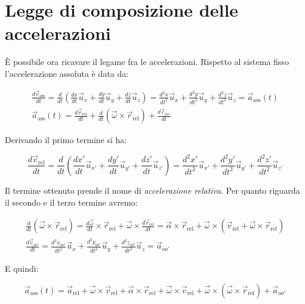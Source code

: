 \begin{figure}[htpb]
\end{figure}

\section{Legge di composizione delle accelerazioni}

È possibile ora ricavare il legame fra le accelerazioni. Rispetto al sistema fisso l'accelerazione assoluta è data da:

\begin{gather*}
	\frac{d\vec{v}_{\text{ass} }}{dt}=\frac{d}{dt}\left(\frac{dx}{dt} \vec{u}_x + \frac{dy}{dt} \vec{u}_y+ \frac{dz}{dt} \vec{u}_z\right)=\frac{d^2x}{dt^2} \vec{u}_x+ \frac{d^2y}{dt^2} \vec{u}_y+\frac{d^2z}{dt^2} \vec{u}_z=\vec{a}_{\text{ass}} (t) \\
	\vec{a}_{\text{ass}}(t)=\frac{d\vec{v}_{\text{rel}}}{dt}+\frac{d}{dt}(\vec{\omega} \times \vec{r}_{\text{rel}})+\frac{d\vec{v}_{oo'}}{dt}
\end{gather*}

Derivando il primo termine si ha:

\[
	\frac{d\vec{v}_{\text{rel}}}{dt}=\frac{d}{dt}\left(\frac{dx'}{dt}\vec{u}_{x'}+\frac{dy'}{dt}\vec{u}_{y'}+\frac{dz'}{dt}\vec{u}_{z'}\right)=\frac{d^2x'}{dt^2} \vec{u}_{x'} + \frac{d^2y'}{dt^2} \vec{u}_{y'}+ \frac{d^2z'}{dt^2} \vec{u}_{z'}
\]

Il termine ottenuto prende il nome di \emph{accelerazione relativa}. Per quanto riguarda il secondo e il terzo termine avremo:

\begin{gather*}
	\frac{d}{dt}(\vec{\omega} \times \vec{r}_{\text{rel}})=\frac{d\vec{\omega}}{dt} \times \vec{r}_{\text{rel}}+\vec{\omega} \times \frac{d\vec{r}_{\text{rel}} }{dt} = \vec{\alpha} \times \vec{r}_{\text{rel}}+\vec{\omega} \times( \vec{v}_{\text{rel}}+\vec{\omega} \times \vec{r}_{\text{rel}}) \\
	\frac{d\vec{v}_{oo'}}{dt}= \frac{d^2x_{oo'}}{dt^2} \vec{u}_x+ \frac{d^2y_{oo'}}{dt^2} \vec{u}_y+ \frac{d^2z_{oo'}}{dt^2} \vec{u}_z=\vec{a}_{oo'}
\end{gather*}

E quindi:

\[
	\vec{a}_{\text{ass}}(t)=\vec{a}_{\text{rel}} +\vec{\omega} \times \vec{v}_{\text{rel}}+\vec{\alpha}\times \vec{r}_{\text{rel}}+\vec{\omega} \times \vec{v}_{\text{rel}}+ \vec{\omega}\times({\vec{\omega}}\times \vec{r}_{\text{rel}})+\vec{a}_{oo'}
\]

